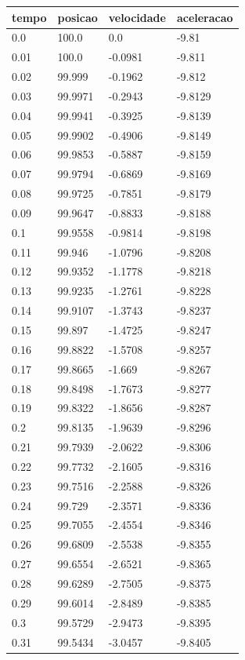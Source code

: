 \begin{tabular}{llll}
\toprule
tempo & posicao & velocidade & aceleracao \\
\midrule
0.0 & 100.0 & 0.0 & -9.81 \\
0.01 & 100.0 & -0.0981 & -9.811 \\
0.02 & 99.999 & -0.1962 & -9.812 \\
0.03 & 99.9971 & -0.2943 & -9.8129 \\
0.04 & 99.9941 & -0.3925 & -9.8139 \\
0.05 & 99.9902 & -0.4906 & -9.8149 \\
0.06 & 99.9853 & -0.5887 & -9.8159 \\
0.07 & 99.9794 & -0.6869 & -9.8169 \\
0.08 & 99.9725 & -0.7851 & -9.8179 \\
0.09 & 99.9647 & -0.8833 & -9.8188 \\
0.1 & 99.9558 & -0.9814 & -9.8198 \\
0.11 & 99.946 & -1.0796 & -9.8208 \\
0.12 & 99.9352 & -1.1778 & -9.8218 \\
0.13 & 99.9235 & -1.2761 & -9.8228 \\
0.14 & 99.9107 & -1.3743 & -9.8237 \\
0.15 & 99.897 & -1.4725 & -9.8247 \\
0.16 & 99.8822 & -1.5708 & -9.8257 \\
0.17 & 99.8665 & -1.669 & -9.8267 \\
0.18 & 99.8498 & -1.7673 & -9.8277 \\
0.19 & 99.8322 & -1.8656 & -9.8287 \\
0.2 & 99.8135 & -1.9639 & -9.8296 \\
0.21 & 99.7939 & -2.0622 & -9.8306 \\
0.22 & 99.7732 & -2.1605 & -9.8316 \\
0.23 & 99.7516 & -2.2588 & -9.8326 \\
0.24 & 99.729 & -2.3571 & -9.8336 \\
0.25 & 99.7055 & -2.4554 & -9.8346 \\
0.26 & 99.6809 & -2.5538 & -9.8355 \\
0.27 & 99.6554 & -2.6521 & -9.8365 \\
0.28 & 99.6289 & -2.7505 & -9.8375 \\
0.29 & 99.6014 & -2.8489 & -9.8385 \\
0.3 & 99.5729 & -2.9473 & -9.8395 \\
0.31 & 99.5434 & -3.0457 & -9.8405 \\

\end{tabular}
